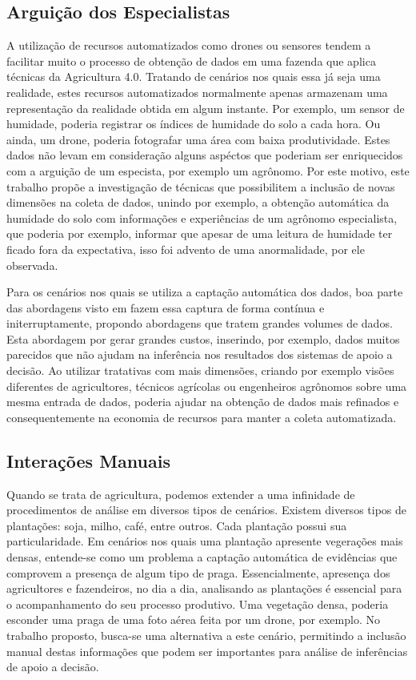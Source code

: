 \documentclass[12pt]{article}
\begin{document}
\subsection{Arguição dos Especialistas}
\label{subsubsec:arquicao_especialistas}

A utilização de recursos automatizados como drones ou sensores tendem a facilitar muito o processo de obtenção de dados em uma fazenda que aplica técnicas da Agricultura 4.0. Tratando de cenários nos quais essa já seja uma realidade, estes recursos automatizados normalmente apenas armazenam uma representação da realidade obtida em algum instante. Por exemplo, um sensor de humidade, poderia registrar os índices de humidade do solo a cada hora. Ou ainda, um drone, poderia fotografar uma área com baixa produtividade. Estes dados não levam em consideração alguns aspéctos que poderiam ser enriquecidos com a arguição de um especista, por exemplo um agrônomo. Por este motivo, este trabalho propõe a investigação de técnicas que possibilitem a inclusão de novas dimensões na coleta de dados, unindo por exemplo, a obtenção automática da humidade do solo com informações e experiências de um agrônomo especialista, que poderia por exemplo, informar que apesar de uma leitura de humidade ter ficado fora da expectativa, isso foi advento de uma anormalidade, por ele observada.

Para os cenários nos quais se utiliza a captação automática dos dados, boa parte das abordagens visto em \cite{Massruha:2017} fazem essa captura de forma contínua e initerruptamente, propondo abordagens que tratem grandes volumes de dados. Esta abordagem por gerar grandes custos, inserindo, por exemplo, dados muitos parecidos que não ajudam na inferência nos resultados dos sistemas de apoio a decisão. Ao utilizar tratativas com mais dimensões, criando por exemplo visões diferentes de agricultores, técnicos agrícolas ou engenheiros agrônomos sobre uma mesma entrada de dados, poderia ajudar na obtenção de dados mais refinados e consequentemente na economia de recursos para manter a coleta automatizada.

\subsection{Interações Manuais}

Quando se trata de agricultura, podemos extender a uma infinidade de procedimentos de análise em diversos tipos de cenários. Existem diversos tipos de plantações: soja, milho, café, entre outros. Cada plantação possui sua particularidade. Em cenários nos quais uma plantação apresente vegerações mais densas, entende-se como um problema a captação automática de evidências que comprovem a presença de algum tipo de praga. Essencialmente, apresença dos agricultores e fazendeiros, no dia a dia, analisando as plantações é essencial para o acompanhamento do seu processo produtivo. Uma vegetação densa, poderia esconder uma praga de uma foto aérea feita por um drone, por exemplo. No trabalho proposto, busca-se uma alternativa a este cenário, permitindo a inclusão manual destas informações que podem ser importantes para análise de inferências de apoio a decisão.
\end{document}
